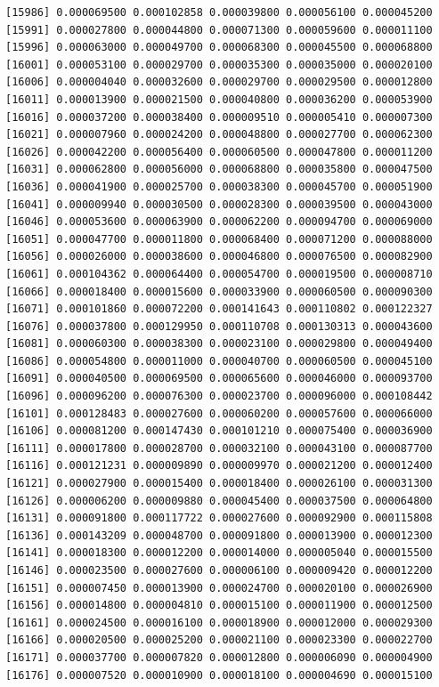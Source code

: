 \documentclass[]{article}
\begin{document}
\begin{verbatim}
[15986] 0.000069500 0.000102858 0.000039800 0.000056100 0.000045200
[15991] 0.000027800 0.000044800 0.000071300 0.000059600 0.000011100
[15996] 0.000063000 0.000049700 0.000068300 0.000045500 0.000068800
[16001] 0.000053100 0.000029700 0.000035300 0.000035000 0.000020100
[16006] 0.000004040 0.000032600 0.000029700 0.000029500 0.000012800
[16011] 0.000013900 0.000021500 0.000040800 0.000036200 0.000053900
[16016] 0.000037200 0.000038400 0.000009510 0.000005410 0.000007300
[16021] 0.000007960 0.000024200 0.000048800 0.000027700 0.000062300
[16026] 0.000042200 0.000056400 0.000060500 0.000047800 0.000011200
[16031] 0.000062800 0.000056000 0.000068800 0.000035800 0.000047500
[16036] 0.000041900 0.000025700 0.000038300 0.000045700 0.000051900
[16041] 0.000009940 0.000030500 0.000028300 0.000039500 0.000043000
[16046] 0.000053600 0.000063900 0.000062200 0.000094700 0.000069000
[16051] 0.000047700 0.000011800 0.000068400 0.000071200 0.000088000
[16056] 0.000026000 0.000038600 0.000046800 0.000076500 0.000082900
[16061] 0.000104362 0.000064400 0.000054700 0.000019500 0.000008710
[16066] 0.000018400 0.000015600 0.000033900 0.000060500 0.000090300
[16071] 0.000101860 0.000072200 0.000141643 0.000110802 0.000122327
[16076] 0.000037800 0.000129950 0.000110708 0.000130313 0.000043600
[16081] 0.000060300 0.000038300 0.000023100 0.000029800 0.000049400
[16086] 0.000054800 0.000011000 0.000040700 0.000060500 0.000045100
[16091] 0.000040500 0.000069500 0.000065600 0.000046000 0.000093700
[16096] 0.000096200 0.000076300 0.000023700 0.000096000 0.000108442
[16101] 0.000128483 0.000027600 0.000060200 0.000057600 0.000066000
[16106] 0.000081200 0.000147430 0.000101210 0.000075400 0.000036900
[16111] 0.000017800 0.000028700 0.000032100 0.000043100 0.000087700
[16116] 0.000121231 0.000009890 0.000009970 0.000021200 0.000012400
[16121] 0.000027900 0.000015400 0.000018400 0.000026100 0.000031300
[16126] 0.000006200 0.000009880 0.000045400 0.000037500 0.000064800
[16131] 0.000091800 0.000117722 0.000027600 0.000092900 0.000115808
[16136] 0.000143209 0.000048700 0.000091800 0.000013900 0.000012300
[16141] 0.000018300 0.000012200 0.000014000 0.000005040 0.000015500
[16146] 0.000023500 0.000027600 0.000006100 0.000009420 0.000012200
[16151] 0.000007450 0.000013900 0.000024700 0.000020100 0.000026900
[16156] 0.000014800 0.000004810 0.000015100 0.000011900 0.000012500
[16161] 0.000024500 0.000016100 0.000018900 0.000012000 0.000029300
[16166] 0.000020500 0.000025200 0.000021100 0.000023300 0.000022700
[16171] 0.000037700 0.000007820 0.000012800 0.000006090 0.000004900
[16176] 0.000007520 0.000010900 0.000018100 0.000004690 0.000015100

\end{verbatim}
\end{document}
